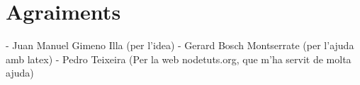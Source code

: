\chapter*{Agraiments}

- Juan Manuel Gimeno Illa (per l'idea)
- Gerard Bosch Montserrate (per l'ajuda amb latex)
- Pedro Teixeira (Per la web nodetuts.org, que m'ha servit de molta ajuda)
